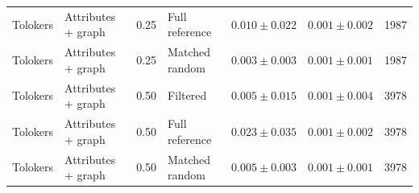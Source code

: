 \begin{tabular}{llrlrrr}
Tolokers & Attributes + graph & 0.25 & Full reference & $0.010\pm0.022$ & $0.001\pm0.002$ & 1987 \\
Tolokers & Attributes + graph & 0.25 & Matched random & $0.003\pm0.003$ & $0.001\pm0.001$ & 1987 \\
Tolokers & Attributes + graph & 0.50 & Filtered & $0.005\pm0.015$ & $0.001\pm0.004$ & 3978 \\
Tolokers & Attributes + graph & 0.50 & Full reference & $0.023\pm0.035$ & $0.001\pm0.002$ & 3978 \\
Tolokers & Attributes + graph & 0.50 & Matched random & $0.005\pm0.003$ & $0.001\pm0.001$ & 3978 \\
\bottomrule
\end{tabular}
